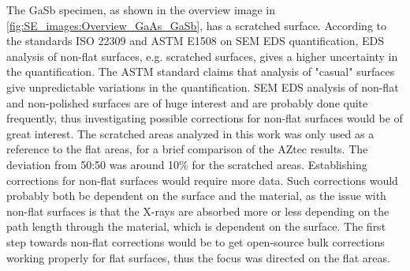 

The GaSb specimen, as shown in the overview image in \cref{fig:SE_images:Overview_GaAs_GaSb}, has a scratched surface.
According to the standards ISO 22309 \cite{iso_quantification_22309} and ASTM E1508 \cite{astm_e1508_eds_quantification} on SEM EDS quantification, EDS analysis of non-flat surfaces, e.g. scratched surfaces, gives a higher uncertainty in the quantification.
The ASTM standard claims that analysis of "casual" surfaces give unpredictable variations in the quantification.
SEM EDS analysis of non-flat and non-polished surfaces are of huge interest and are probably done quite frequently, thus investigating possible corrections for non-flat surfaces would be of great interest.
The scratched areas analyzed in this work was only used as a reference to the flat areas, for a brief comparison of the AZtec results.
The deviation from 50:50 was around 10\% for the scratched areas.
Establishing corrections for non-flat surfaces would require more data.
Such corrections would probably both be dependent on the surface and the material, as the issue with non-flat surfaces is that the X-rays are absorbed more or less depending on the path length through the material, which is dependent on the surface.
The first step towards non-flat corrections would be to get open-source bulk corrections working properly for flat surfaces, thus the focus was directed on the flat areas.


